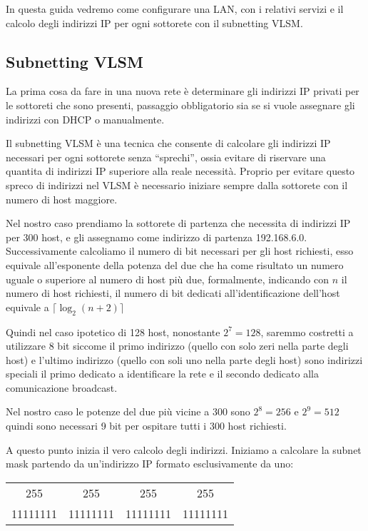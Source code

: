 In questa guida vedremo come configurare una LAN, con i relativi servizi e il calcolo degli indirizzi IP per ogni sottorete con il subnetting VLSM.

\subsection{Subnetting VLSM}
La prima cosa da fare in una nuova rete è determinare gli indirizzi IP privati per le sottoreti che sono presenti, passaggio obbligatorio sia se si vuole assegnare gli indirizzi con DHCP o manualmente.

Il subnetting VLSM è una tecnica che consente di calcolare gli indirizzi IP necessari per ogni sottorete senza ``sprechi'', ossia evitare di riservare una quantita di indirizzi IP superiore alla reale necessità.
Proprio per evitare questo spreco di indirizzi nel VLSM è necessario iniziare sempre dalla sottorete con il numero di host maggiore.

Nel nostro caso prendiamo la sottorete di partenza che necessita di indirizzi IP per 300 host, e gli assegnamo come indirizzo di partenza 192.168.6.0. Successivamente calcoliamo il numero di bit necessari per gli host richiesti, esso equivale all’esponente della potenza del due che ha come risultato un numero uguale o superiore al numero di host più due, formalmente, indicando con $n$ il numero di host richiesti, il numero di bit dedicati all'identificazione dell'host equivale a $\lceil \log_2 (n + 2) \rceil$

Quindi nel caso ipotetico di 128 host, nonostante $2^7 = 128$, saremmo costretti a utilizzare 8 bit siccome il primo indirizzo (quello con solo zeri nella parte degli host) e l'ultimo indirizzo (quello con soli uno nella parte degli host) sono indirizzi speciali il primo dedicato a identificare la rete e il secondo dedicato alla comunicazione broadcast.

Nel nostro caso le potenze del due più vicine a $300$ sono $2^8 = 256$ e $2^9 = 512$ quindi sono necessari 9 bit per ospitare tutti i $300$ host richiesti.

A questo punto inizia il vero calcolo degli indirizzi. Iniziamo a calcolare la subnet mask partendo da un'indirizzo IP formato esclusivamente da uno:

\begin{center}
    \begin{tabular}{c@{.}c@{.}c@{.}c}
        255 & 255 & 255 & 255\\
        11111111 & 11111111 & 11111111 & 11111111
    \end{tabular}
\end{center}

